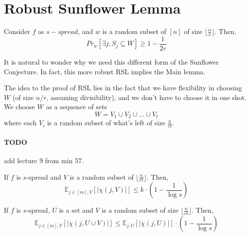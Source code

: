 \section{Robust Sunflower Lemma}
\begin{lemma}
	Consider $f$ as $s-spread$, and $w$ is a random subset of $[n]$ of size $\lfloor \frac{n}{r} \rfloor$. Then, 
	\begin{equation}
		Pr_{w} [\exists j, S_j \subseteq W] \geq 1 - \frac{1}{2r}
	\end{equation}
\end{lemma}

It is natural to wonder why we need this different form of the Sunflower Conjecture. In fact, this more robust RSL implies the Main lemma. 

The idea to the proof of RSL lies in the fact that we have flexibility in choosing $W$ (of size $n/r$, assuming divisibility), and we don't have to choose it in one shot. We choose $W$ as a sequence of sets
\begin{equation}
	W = V_1 \cup V_2 \cup \dots \cup V_t
\end{equation}
where each $V_i$ is a random subset of what's left of size $\frac{n}{rt}$. 

\paragraph{TODO} add lecture 9 from min 57. 
%
%

\begin{proposition}
	If $f$ is $s$-spread and $V$ is a random subset of $\lfloor \frac{n}{rt} \rfloor$. Then, 
	\begin{equation}
		\mathbb E_{j \in [m], V} [|\chi (j, V) |] \leq k \cdot \left( 1 - \frac{1}{\log s} \right) 
	\end{equation}
\end{proposition}

\begin{proposition}
	If $f$ is $s$-spread, $U$ is a set and $V$ is a random subset of size $\lfloor \frac{n}{rt} \rfloor$. Then, 
	\begin{equation}
		\mathbb E_{j \in [m], V} [ | \chi (j, U \cup V ) | ] \leq \mathbb E _{j, U} [|\chi (j, U) |] \cdot \left( 1 - \frac{1}{\log s} \right) 
	\end{equation}
\end{proposition}

